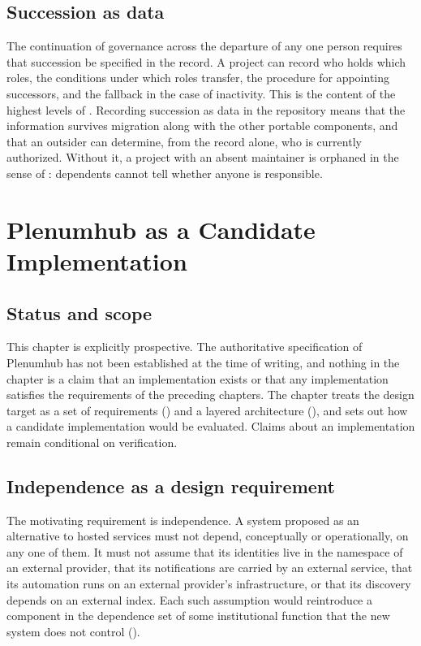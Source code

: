 \documentclass[11pt,twoside,openright]{book}
\theoremstyle{plain}
\theoremstyle{definition}
\theoremstyle{remark}
\begin{document}
\section{Succession as data}

The continuation of governance across the departure of any one person requires that succession be specified in the record. A project can record who holds which roles, the conditions under which roles transfer, the procedure for appointing successors, and the fallback in the case of inactivity. This is the content of the highest levels of . Recording succession as data in the repository means that the information survives migration along with the other portable components, and that an outsider can determine, from the record alone, who is currently authorized. Without it, a project with an absent maintainer is orphaned in the sense of : dependents cannot tell whether anyone is responsible.

\chapter{Plenumhub as a Candidate Implementation}\label{ch:plenumhub}

\section{Status and scope}

This chapter is explicitly prospective. The authoritative specification of Plenumhub has not been established at the time of writing, and nothing in the chapter is a claim that an implementation exists or that any implementation satisfies the requirements of the preceding chapters. The chapter treats the design target as a set of requirements () and a layered architecture (), and sets out how a candidate implementation would be evaluated. Claims about an implementation remain conditional on verification.

\section{Independence as a design requirement}

The motivating requirement is independence. A system proposed as an alternative to hosted services must not depend, conceptually or operationally, on any one of them. It must not assume that its identities live in the namespace of an external provider, that its notifications are carried by an external service, that its automation runs on an external provider's infrastructure, or that its discovery depends on an external index. Each such assumption would reintroduce a component in the dependence set of some institutional function that the new system does not control ().
\end{document}
